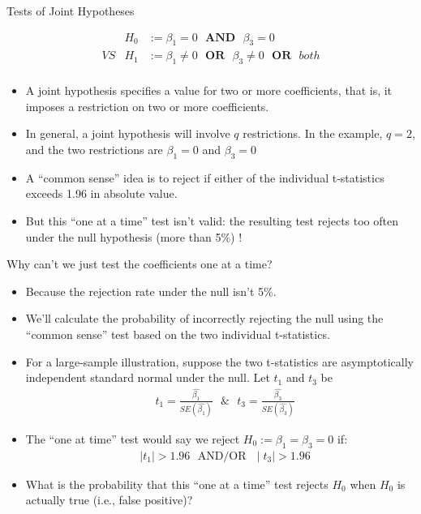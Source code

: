 \documentclass[notes,10pt, aspectratio=169]{beamer}
\begin{document}
\begin{frame}{Tests of Joint Hypotheses }

\begin{eqnarray*}
    & H_0 &:= \beta_1=0 \textbf{~~AND~~} \beta_3=0\\
    VS & H_1 &:= \beta_1\neq0 \textbf{~~OR~~} \beta_3\neq0 \textbf{~~OR~~} both \\
\end{eqnarray*}

\begin{itemize}
    \item A joint hypothesis specifies a value for two or more coefficients, that is, it imposes a restriction on two or more coefficients.
    \item In general, a joint hypothesis will involve $q$ restrictions. In the example, $q=2$, and the two restrictions are $\beta_1=0$ and $\beta_3=0$
    \item A ``common sense'' idea is to reject if either of the individual t-statistics exceeds 1.96 in absolute value.
    \item But this ``one at a time'' test isn’t valid: the resulting test rejects too often under the null hypothesis (more than 5\%) !
\end{itemize}

\end{frame}

\begin{frame}{Why can’t we just test the coefficients one at a time?}
\begin{itemize}
    \item Because the rejection rate under the null isn’t 5\%.
    \item We’ll calculate the probability of incorrectly rejecting the null using the ``common sense'' test based on the two individual t-statistics.
    \item For a large-sample illustration, suppose the two t-statistics are asymptotically independent standard normal under the null. Let $t_1$ and $t_3$ be
    \begin{eqnarray*}
    & t_1 = \frac{\hat{\beta_1}}{SE(\hat{\beta_1})} \text{~~\&~~} t_3 = \frac{\hat{\beta_3}}{SE(\hat{\beta_3})}
    \end{eqnarray*}
    \item The ``one at time'' test would say we reject $H_0:= \beta_1=\beta_3=0$ if:
        \begin{eqnarray*}
    & \mid t_1 \mid > 1.96 \text{~~AND/OR~~}\mid t_3 \mid > 1.96
    \end{eqnarray*}
    \item What is the probability that this ``one at a time'' test rejects $H_0$ when $H_0$ is actually true (i.e., false positive)?    
\end{itemize}
\end{frame}
\end{document}
